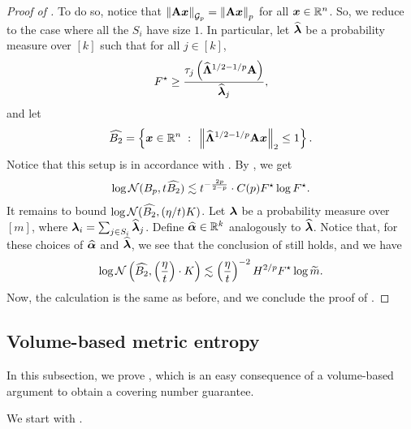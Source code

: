 \documentclass[11pt]{article}
\numberwithin{equation}{section}
\begin{document}
\begin{proof}[Proof of ]
To do so, notice that $\left\lVert \mathbf{A}\bm{x} \right\rVert_{\mathcal{G}_{p}} = \left\lVert \mathbf{A}\bm{x} \right\rVert_p$ for all $\bm{x}\in\mathbb{R}^n$. So, we reduce to the case where all the $S_i$ have size $1$. In particular, let $\widehat{\bm{\lambda}}$ be a probability measure over $[k]$ such that for all $j\in [k]$,
\begin{align*}
    F^{\star} \ge \frac{\tau_j\left(\widehat{\mathbf{\Lambda}}^{1/2-1/p}\mathbf{A}\right)}{\widehat{\bm{\lambda}}_j},
\end{align*}
and let
\begin{align*}
    \widehat{B_2} = \left\{\bm{x}\in\mathbb{R}^n{\;\; : \;\;} \left\lVert \widehat{\mathbf{\Lambda}}^{1/2-1/p}\mathbf{A}\bm{x} \right\rVert_2 \le 1\right\}.
\end{align*}
Notice that this setup is in accordance with . By , we get
\begin{align*}
    \log\mathcal{N}(B_p,t\widehat{B_2}) \lesssim t^{-\frac{2p}{2-p}} \cdot C(p)F^{\star}\log F^{\star}.
\end{align*}
It remains to bound $\log\mathcal{N}(\widehat{B_2},(\eta/t)K)$. Let $\bm{\lambda}$ be a probability measure over $[m]$, where $\bm{\lambda}_i = \sum_{j \in S_i} \widehat{\bm{\lambda}}_j$. Define $\widehat{\bm{\alpha}} \in \mathbb{R}^k$ analogously to $\widehat{\bm{\lambda}}$. Notice that, for these choices of $\widehat{\bm{\alpha}}$ and $\widehat{\bm{\lambda}}$, we see that the conclusion of  still holds, and we have
\begin{align*}
    \log\mathcal{N}\left(\widehat{B_2},\left(\frac{\eta}{t}\right) \cdot K\right) \lesssim \left(\frac{\eta}{t}\right)^{-2}H^{2/p}F^{\star}\log\widetilde{m}.
\end{align*}
Now, the calculation is the same as before, and we conclude the proof of .
\end{proof}

\subsection{Volume-based metric entropy}

In this subsection, we prove , which is an easy consequence of a volume-based argument to obtain a covering number guarantee.

We start with .
\end{document}
